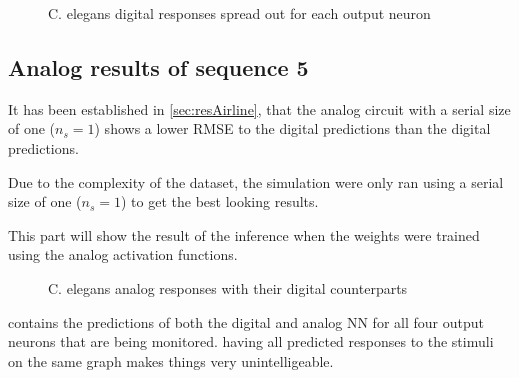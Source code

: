 \begin{figure}[H]
  \centering
  \begin{minipage}{\columnwidth}
    \hfill
  \end{minipage}
  \begin{minipage}{\columnwidth}
    \hfill
  \end{minipage}
  \caption{\ac{C. elegans} digital responses spread out for each output neuron}
  \label{graph:digital15Celegans}
\end{figure}

\subsection{Analog results of sequence 5}
\label{subsec:analog5Celegans}

It has been established in \cref{sec:resAirline}, that the analog circuit with a serial size of one ($n_s=1$) shows a lower \ac{RMSE} to the digital predictions than the digital predictions.

Due to the complexity of the dataset, the simulation were only ran using a serial size of one ($n_s=1$) to get the best looking results.

This part will show the result of the inference when the weights were trained using the analog activation functions.

\begin{figure}[H]
  \centering
  
  \caption{\acs{C. elegans} analog responses with their digital counterparts}
  \label{graph:celegansAnalog0}
\end{figure}

 contains the predictions of both the digital and analog \ac{NN} for all four output neurons that are being monitored.  having all predicted responses to the stimuli on the same graph makes things very unintelligeable.

